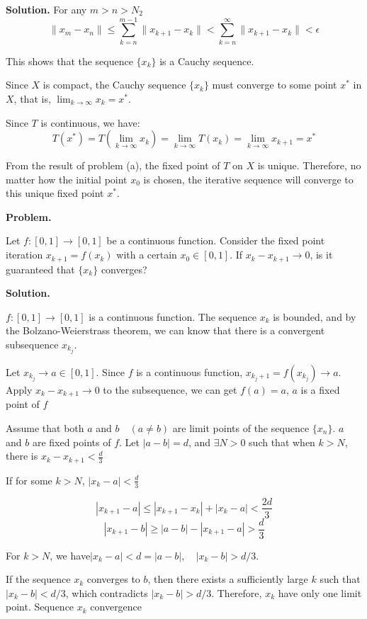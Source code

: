 \documentclass[12pt, a4paper, oneside]{ctexart}
\newcounter{problemname}
\newenvironment{problem}{\begin{shaded}\stepcounter{problemname}\par\noindent\textbf{Problem\arabic{problemname}. }}{\end{shaded}\par}
\newenvironment{solution}{\par\noindent\textbf{Solution. }}{\par}
\begin{document}
\begin{solution}
For any $m > n > N_2$
$$\|x_m - x_n\| \leq \sum_{k = n}^{m - 1} \|x_{k + 1} - x_k\| < \sum_{k = n}^{\infty} \|x_{k + 1} - x_k\| < \epsilon$$

This shows that the sequence $\{x_k\}$ is a Cauchy sequence.

Since $ X $ is compact, the Cauchy sequence $ \{x_k\} $ must converge to some point $ x^* $ in $ X $, that is, $ \lim_{k \to \infty} x_k = x^* $.

Since $ T $ is continuous, we have:
$$
T(x^*) = T\left( \lim_{k \to \infty} x_k \right) = \lim_{k \to \infty} T(x_k) = \lim_{k \to \infty} x_{k + 1} = x^*
$$

From the result of problem (a), the fixed point of $ T $ on $ X $ is unique. Therefore, no matter how the initial point $ x_0 $ is chosen, the iterative sequence will converge to this unique fixed point $ x^* $.

\end{solution}






\begin{problem}

\noindent Let $ f : [0,1] \to [0,1] $ be a continuous function. Consider the fixed point iteration $ x_{k+1} = f(x_k) $ with a certain $ x_0 \in [0,1] $. If $ x_k - x_{k+1} \to 0 $, is it guaranteed that $ \{x_k\} $ converges?

\end{problem}

\begin{solution}


$f: [0,1] \to [0,1]$ is a continuous function. The sequence $ x_k $ is bounded, and by the Bolzano-Weierstrass theorem, we can know that there is a convergent subsequence $ x_{k_j} $.

Let $ x_{k_j} \rightarrow a \in [0,1]$. Since $f$ is a continuous function, $ x_{k_j+1}=f(x_{k_j})\rightarrow a$. Apply $x_k-x_{k+1}\rightarrow 0$ to the subsequence, we can get $f(a)=a$, $a$ is a fixed point of $f$

Assume that both $ a $ and $ b \quad (a \neq b)$ are limit points of the sequence $\{x_n\}$. $a$ and $b$ are fixed points of $f$. Let $|a-b|=d$, and $\exists N>0$ such that when $k>N$, there is $x_k-x_{k+1}<\frac{d}{3}$

If for some $k>N$, $|x_k-a| <\frac{d}{3} $

$$
|x_{k+1}-a|\leq |x_{k+1}-x_k|+|x_k-a|<\frac{2d}{3}
$$
$$
|x_{k+1}-b|\geq|a-b|- |x_{k+1}-a|>\frac{d}{3}
$$

For $k>N$, we have$|x_k - a| < d = |a - b|, \quad |x_k - b| >  d/3$. 

If the sequence $ x_k $ converges to $ b $, then there exists a sufficiently large $ k $ such that $ |x_k - b| < d/3 $, which contradicts $ |x_k - b| >  d/3 $. Therefore, $ x_k $ have only one limit point. Sequence $x_k$ convergence

\end{solution}
\end{document}
